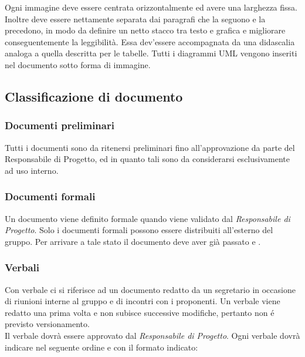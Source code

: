 	Ogni immagine deve essere centrata orizzontalmente ed avere una larghezza fissa. Inoltre deve essere nettamente separata dai paragrafi che la seguono e la precedono, in modo da definire un netto stacco tra testo e grafica e migliorare conseguentemente la leggibilità. Essa dev'essere accompagnata da una didascalia analoga a quella descritta per le tabelle. Tutti i diagrammi UML vengono inseriti nel documento sotto forma di immagine.
	
\subsection{Classificazione di documento}

	\subsubsection{Documenti preliminari}
	
	Tutti i documenti sono da ritenersi preliminari fino all'approvazione da parte del Responsabile di Progetto, ed in quanto tali sono da considerarsi esclusivamente ad uso interno.
	
	\subsubsection{Documenti formali}
	
	Un documento viene definito formale quando viene validato dal \textit{Responsabile di Progetto}. Solo i documenti formali possono essere distribuiti all'esterno del gruppo. Per arrivare a tale stato il documento deve aver già passato  e .
	
	\subsubsection{Verbali}
	
	\label{verbale}
	Con verbale ci si riferisce ad un documento redatto da un segretario in occasione  di riunioni interne al gruppo e di incontri con i proponenti. Un verbale viene redatto una prima volta e non subisce successive modifiche, pertanto non é previsto versionamento. \\
	Il verbale dovrà essere approvato dal \textit{Responsabile di Progetto}. Ogni verbale dovrà indicare nel seguente ordine e con il formato indicato:	
	
